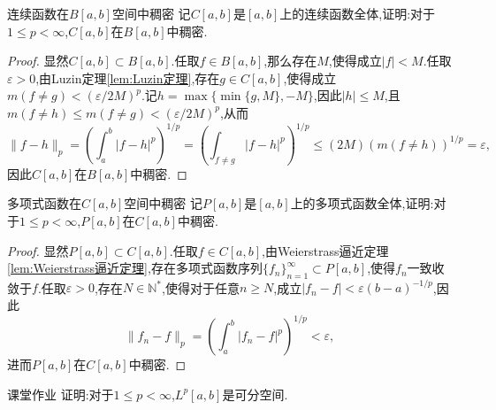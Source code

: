 \documentclass[lang = cn, scheme = chinese]{elegantbook}
\begin{document}
	\begin{lemma}{连续函数在$B[a,b]$空间中稠密}
		记$C[a,b]$是$[a,b]$上的连续函数全体,证明:对于$1\le p<\infty$,$C[a,b]$在$B[a,b]$中稠密.
	\end{lemma}
	
	\begin{proof}
		显然$C[a,b]\subset B[a,b]$.任取$f\in B[a,b]$,那么存在$M$,使得成立$|f|<M$.任取$\varepsilon>0$,由Luzin定理\ref{lem:Luzin定理},存在$g\in C[a,b]$,使得成立$m(f\ne g)<(\varepsilon/2M)^p$.记$h=\max\{ \min\{g,M\},-M \}$,因此$|h|\le M$,且$m(f\ne h)\le m(f\ne g )<(\varepsilon/2M)^p$,从而
		$$
		\|f-h\|_p
		=\left(\int_a^b|f-h|^p\right)^{1/p}
		=\left(\int_{f\ne g}|f-h|^p\right)^{1/p}
		\le (2M)(m(f\ne h))^{1/p}=\varepsilon,
		$$
		因此$C[a,b]$在$B[a,b]$中稠密.
	\end{proof}
	
	\begin{lemma}{多项式函数在$C[a,b]$空间中稠密}
		记$P[a,b]$是$[a,b]$上的多项式函数全体,证明:对于$1\le p<\infty$,$P[a,b]$在$C[a,b]$中稠密.
	\end{lemma}
	
	\begin{proof}
		显然$P[a,b]\subset C[a,b]$.任取$f\in C[a,b]$,由Weierstrass逼近定理\ref{lem:Weierstrass逼近定理},存在多项式函数序列$\{f_n\}_{n=1}^{\infty}\subset P[a,b]$,使得$f_n$一致收敛于$f$.任取$\varepsilon>0$,存在$N\in\mathbb{N}^*$,使得对于任意$n\ge N$,成立$|f_n-f|<\varepsilon(b-a)^{-1/p}$,因此
		$$
		\|f_n-f\|_p=\left(\int_a^b|f_n-f|^p\right)^{1/p}<\varepsilon,
		$$
		进而$P[a,b]$在$C[a,b]$中稠密.
	\end{proof}
	
	\begin{proposition}{课堂作业}
		证明:对于$1\le p<\infty$,$L^p[a,b]$是可分空间.
	\end{proposition}
	
\end{document}
